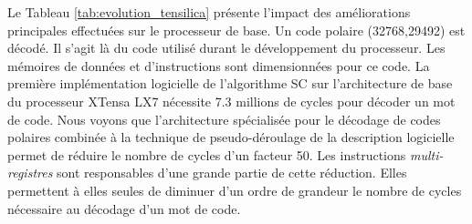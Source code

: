 Le Tableau \ref{tab:evolution_tensilica} présente l'impact des améliorations principales effectuées sur le processeur de base. Un code polaire (32768,29492) est décodé. Il s'agit là du code utilisé durant le développement du processeur. Les mémoires de données et d'instructions sont dimensionnées pour ce code. La première implémentation logicielle de l'algorithme SC sur l'architecture de base du processeur XTensa LX7 nécessite 7.3 millions de cycles pour décoder un mot de code. Nous voyons que l'architecture spécialisée pour le décodage de codes polaires combinée à la technique de pseudo-déroulage de la description logicielle permet de réduire le nombre de cycles d'un facteur 50. Les instructions \textit{multi-registres} sont responsables d'une grande partie de cette réduction. Elles permettent à elles seules de diminuer d'un ordre de grandeur le nombre de cycles nécessaire au décodage d'un mot de code.
 \begin{table}[htp]
    \renewcommand{\arraystretch}{1.1}
    \centering
    \caption{Impact de chaque amélioration de l'ASIP sur le nombre de cycles d'horloges nécessaires pour décoder une trame, le débit et la surface occupée. La taille des mémoires n'est pas prise en compte pour la surface occupée. Décodage d'un code polaire (32768,29492). Fréquence considérée : 835 MHz.}
    \label{tab:evolution_tensilica}
    {\small{}}
  \end{table}


